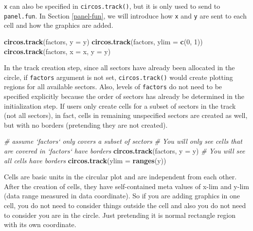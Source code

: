 \documentclass[]{book}
\newenvironment{Shaded}{\begin{snugshade}}{\end{snugshade}}
\newcommand{\KeywordTok}[1]{\textcolor[rgb]{0.13,0.29,0.53}{\textbf{#1}}}
\newcommand{\DataTypeTok}[1]{\textcolor[rgb]{0.13,0.29,0.53}{#1}}
\newcommand{\DecValTok}[1]{\textcolor[rgb]{0.00,0.00,0.81}{#1}}
\newcommand{\CommentTok}[1]{\textcolor[rgb]{0.56,0.35,0.01}{\textit{#1}}}
\newcommand{\NormalTok}[1]{#1}
\theoremstyle{definition}
\theoremstyle{definition}
\theoremstyle{remark}
\begin{document}
\texttt{x} can also be specified in \texttt{circos.track()}, but it is
only used to send to \texttt{panel.fun}. In Section \ref{panel-fun}, we
will introduce how \texttt{x} and \texttt{y} are sent to each cell and
how the graphics are added.

\begin{Shaded}
\begin{Highlighting}[]
\KeywordTok{circos.track}\NormalTok{(factors, }\DataTypeTok{y =}\NormalTok{ y)}
\KeywordTok{circos.track}\NormalTok{(factors, }\DataTypeTok{ylim =} \KeywordTok{c}\NormalTok{(}\DecValTok{0}\NormalTok{, }\DecValTok{1}\NormalTok{))}
\KeywordTok{circos.track}\NormalTok{(factors, }\DataTypeTok{x =}\NormalTok{ x, }\DataTypeTok{y =}\NormalTok{ y)}
\end{Highlighting}
\end{Shaded}

In the track creation step, since all sectors have already been
allocated in the circle, if \texttt{factors} argument is not set,
\texttt{circos.track()} would create plotting regions for all available
sectors. Also, levels of \texttt{factors} do not need to be specified
explicitly because the order of sectors has already be determined in the
initialization step. If users only create cells for a subset of sectors
in the track (not all sectors), in fact, cells in remaining unspecified
sectors are created as well, but with no borders (pretending they are
not created).

\begin{Shaded}
\begin{Highlighting}[]
\CommentTok{# assume `factors` only covers a subset of sectors}
\CommentTok{# You will only see cells that are covered in `factors` have borders}
\KeywordTok{circos.track}\NormalTok{(factors, }\DataTypeTok{y =}\NormalTok{ y)}
\CommentTok{# You will see all cells have borders}
\KeywordTok{circos.track}\NormalTok{(}\DataTypeTok{ylim =} \KeywordTok{ranges}\NormalTok{(y))}
\end{Highlighting}
\end{Shaded}

Cells are basic units in the circular plot and are independent from each
other. After the creation of cells, they have self-contained meta values
of x-lim and y-lim (data range measured in data coordinate). So if you
are adding graphics in one cell, you do not need to consider things
outside the cell and also you do not need to consider you are in the
circle. Just pretending it is normal rectangle region with its own
coordinate.
\end{document}
